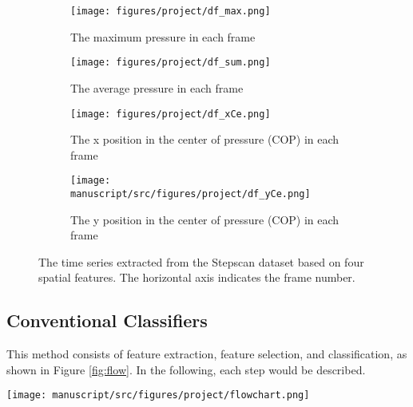 \begin{figure}
     \centering
     \begin{subfigure}[b]{0.5\textwidth}
         \centering
         \texttt{[image: figures/project/df\_max.png]}
         \caption{The maximum pressure in each frame}
         \label{fig:extracted_features_max}
     \end{subfigure}
     \hfill
     \begin{subfigure}[b]{0.5\textwidth}
         \centering
         \texttt{[image: figures/project/df\_sum.png]}
         \caption{The average pressure in each frame}
         \label{fig:extracted_features_sum}
     \end{subfigure}
     \vfill
     \begin{subfigure}[b]{0.5\textwidth}
         \centering
         \texttt{[image: figures/project/df\_xCe.png]}
         \caption{The x position in the center of pressure (COP) in each frame}
         \label{fig:extracted_features_xCe}
     \end{subfigure}
     \hfill
     \begin{subfigure}[b]{0.5\textwidth}
         \centering
         \texttt{[image: manuscript/src/figures/project/df\_yCe.png]}
         \caption{The y position in the center of pressure (COP) in each frame}
         \label{fig:extracted_features_yCe}
     \end{subfigure} 
        \caption{The time series extracted from the Stepscan dataset based on four spatial features. The horizontal axis indicates the frame number. }
        \label{fig:extracted_features}
\end{figure}







\subsection{Conventional Classifiers}

This method consists of feature extraction, feature selection, and classification, as shown in Figure \ref{fig:flow}. In the following, each step would be described. 
 

\begin{center}
	\begin{figure*}[!t]
    	\centering
        \begin{minipage}[b]{\textwidth}
            \texttt{[image: manuscript/src/figures/project/flowchart.png]}
        \end{minipage}
        \hspace{-1em}
        \caption{Flowchart of implemented method.}
        \label{fig:flow}
	\end{figure*}
\end{center}







